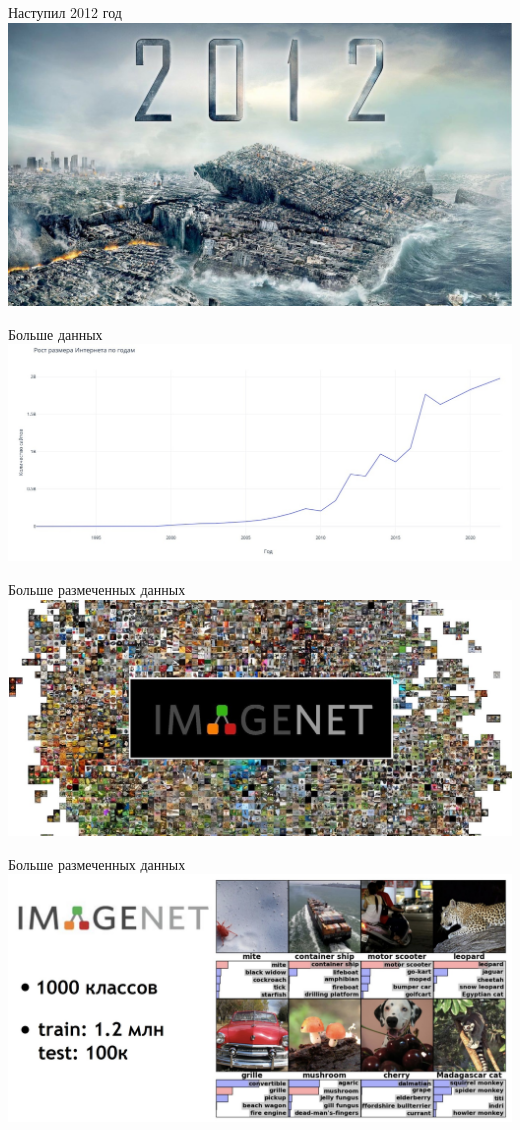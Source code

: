 \documentclass[aspectratio=169, professionalfonts]{beamer}
\begin{document}
\begin{frame}{Наступил 2012 год}
    \centering
    \includegraphics[width=.85\linewidth]{graphs/fig24.jpg}
\end{frame}

\begin{frame}{Больше данных}
    \centering
    \includegraphics[width=\linewidth]{graphs/fig25.jpg}
\end{frame}

\begin{frame}{Больше размеченных данных}
    \centering
    \includegraphics[width=\linewidth]{graphs/fig26.jpg}
\end{frame}

\begin{frame}{Больше размеченных данных}
    \centering
    \includegraphics[width=.97\linewidth]{graphs/fig27.jpg}
\end{frame}
\end{document}
